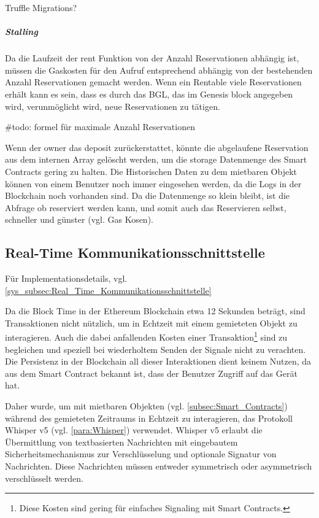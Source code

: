 Truffle Migrations?

\subparagraph{Stalling}
\label{subpara:Stalling}
Da die Laufzeit der rent Funktion von der Anzahl Reservationen abhängig ist, müssen die Gaskosten für den Aufruf entsprechend abhängig von der bestehenden Anzahl Reservationen gemacht werden. Wenn ein Rentable viele Reservationen erhält kann es sein, dass es durch das \acrfull{BGL}, das im Genesis block angegeben wird, verunmöglicht wird, neue Reservationen zu tätigen.\cite[Security Considerations/Gas Limit and Loops]{solidity.readthedocs.io}\cite{media.consensys.net/gas-and-fuel}

\#todo: formel für maximale Anzahl Reservationen

Wenn der owner das deposit zurückerstattet, könnte die abgelaufene Reservation aus dem internen Array gelöscht werden, um die storage Datenmenge des Smart Contracts gering zu halten. Die Historischen Daten zu dem mietbaren Objekt können von einem Benutzer noch immer eingesehen werden, da die Logs in der Blockchain noch vorhanden sind. Da die Datenmenge so klein bleibt, ist die Abfrage ob reserviert werden kann, und somit auch das Reservieren selbst, schneller und günster (vgl. Gas Kosen).

\subsection{Real-Time Kommunikationsschnittstelle}
\label{subsec:Real_Time_Kommunikationsschnittstelle}
Für Implementationsdetails, vgl. \ref{sys_subsec:Real_Time_Kommunikationsschnittstelle}

Da die Block Time in der Ethereum Blockchain etwa 12 Sekunden beträgt, sind Transaktionen nicht nützlich, um in Echtzeit mit einem gemieteten Objekt zu interagieren. Auch die dabei anfallenden Kosten einer Transaktion\footnote{Diese Kosten sind gering für einfaches Signaling mit Smart Contracts.} sind zu begleichen und speziell bei wiederholtem Senden der Signale nicht zu verachten. Die Persistenz in der Blockchain all dieser Interaktionen dient keinem Nutzen, da aus dem Smart Contract bekannt ist, dass der Benutzer Zugriff auf das Gerät hat. \cite{blog.ethereum.org/block-time}

Daher wurde, um mit mietbaren Objekten (vgl. \ref{subsec:Smart_Contracts}) während des gemieteten Zeitraums in Echtzeit zu interagieren, das Protokoll Whisper v5 (vgl. \ref{para:Whisper}) verwendet. Whisper v5 erlaubt die Übermittlung von textbasierten Nachrichten mit eingebautem Sicherheitsmechanismus zur Verschlüsselung und optionale Signatur von Nachrichten. Diese Nachrichten müssen entweder symmetrisch oder asymmetrisch verschlüsselt werden.\cite[Wiki/Whisper Usage]{go-ethereum}

